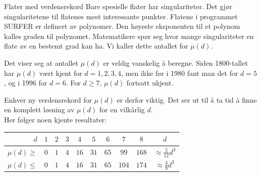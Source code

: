 \begin{surferIntroPage}{Flater med verdensrekord}
	Bare spesielle flater har singulariteter. Det gjør singularitetene til flatenes mest 
  interessante punkter. Flatene i programmet SURFER er definert av polynomer. Den høyeste 
  eksponenten til et polynom kalles graden til polynomet. Matematikere spør seg hvor mange
  singulariteter en flate av en bestemt grad kan ha. Vi kaller dette antallet for $\mu(d)$. 
  
  Det viser seg at antallet $\mu(d)$ er veldig vanskelig å beregne. Siden 1800-tallet har $\mu(d)$ 
  vært kjent for $d=1,2,3,4$, men ikke før i 1980 fant man det for $d=5$, og i 1996 for $d=6$.
  For $d\ge 7$, $\mu(d)$ fortsatt ukjent. 

  Enhver ny verdensrekord for $\mu(d)$ er derfor viktig. Det ser ut til å ta tid å finne en komplett løsning av $\mu(d)$ for en 
  vilkårlig $d$.\\ Her følger noen kjente resultater:
  
    
   \begin{center}
      \begin{tabular}{r|cccccccc|c}
        $d$ & $1$ & $2$ & $3$ & $4$ & $5$ & $6$ & $7$ & $8$ & $d$\\
        \hline
        \hline
        \rule{0pt}{1.2em}$\mu(d)\ge$ & $0$ & $1$ & $4$ & $16$ & $31$ & $65$ &
        $99$ & $168$ & 
        $\approx \frac{5}{12}d^3$\\[0.3em]
        \hline
        \rule{0pt}{1.2em}$\mu(d)\le$ & $0$ & $1$ & $4$ & $16$ & $31$ & $65$ &
        $104$ & $174$ & $\approx \frac{4}{9}d^3$
      \end{tabular}
    \end{center}
\end{surferIntroPage}
